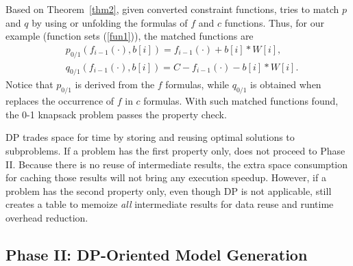 \begin{comment}
   & \because \text{ The evaluation processes of $f_k(\cdot)$ between $b_{Ak}'$ and $b_{Ak}''$} \nonumber \\
   & \text{have overlapping subproblems} \nonumber \\
   & \therefore \text{The evaluation processes of $f_{k+1}(\cdot)$ between $b_{A(k+1)'}$}\nonumber \\
   &\text{ and $b_{A(k+1)}''$ also overlap.} \nonumber 
\end{align}    
\end{enumerate}
Therefore, when different value assignments of $b$ are explored, there are overlapping subproblems to resolve. 
\end{proof}
\end{comment}

Based on Theorem~\ref{thm2}, given converted constraint functions, \tool tries to match $p$ and $q$ by using or unfolding the formulas of 
 $f$ and $c$ functions. Thus, for our example (function sets (\ref{fun1})), the matched functions are
\begin{align}
    & p_{0/1}(f_{i-1}(\cdot), b[i])=f_{i-1}(\cdot)+b[i]*W[i], \nonumber\\
    & q_{0/1}(f_{i-1}(\cdot), b[i])=C-f_{i-1}(\cdot)-b[i]*W[i]. \nonumber
\end{align}
Notice that $p_{0/1}$ is derived from the $f$ formulas, while $q_{0/1}$ is obtained when \tool replaces the occurrence of $f$ in $c$ formulas. 
 With such matched functions found, the 0-1 knapsack problem passes the property check. 
 
DP trades space for time by storing and reusing optimal solutions to subproblems. 
If a problem has the first property only, \tool does not proceed to Phase II. Because there is no reuse of intermediate results, the extra space consumption for caching those results will not bring any execution speedup. 
However, if a problem has the second property only, even though DP is not applicable, \tool still creates a table to memoize \emph{all} intermediate results  for data reuse and runtime overhead reduction. 

  
 
 
 \subsection{Phase II: DP-Oriented Model Generation}
 \label{sec:generate}
 
